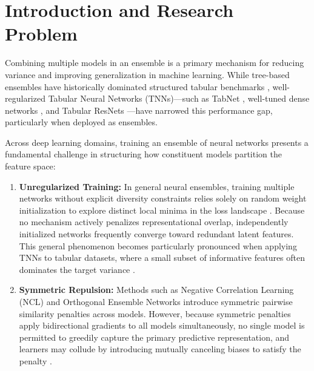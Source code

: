 \documentclass[11pt, a4paper]{article}
\begin{document}
\tableofcontents
\newpage


\section{Introduction and Research Problem}
Combining multiple models in an ensemble is a primary mechanism for reducing variance and improving generalization in machine learning. While tree-based ensembles have historically dominated structured tabular benchmarks \cite{grinsztajn2022why}, well-regularized Tabular Neural Networks (TNNs)—such as TabNet \cite{arik2021tabnet}, well-tuned dense networks \cite{kadra2021well}, and Tabular ResNets \cite{grinsztajn2022why}—have narrowed this performance gap, particularly when deployed as ensembles.

Across deep learning domains, training an ensemble of neural networks presents a fundamental challenge in structuring how constituent models partition the feature space:
\begin{enumerate}
    \item \textbf{Unregularized Training:} In general neural ensembles, training multiple networks without explicit diversity constraints relies solely on random weight initialization to explore distinct local minima in the loss landscape \cite{fort2019deep}. Because no mechanism actively penalizes representational overlap, independently initialized networks frequently converge toward redundant latent features. This general phenomenon becomes particularly pronounced when applying TNNs to tabular datasets, where a small subset of informative features often dominates the target variance \cite{grinsztajn2022why}.
    \item \textbf{Symmetric Repulsion:} Methods such as Negative Correlation Learning (NCL) \cite{liu1999ensemble} and Orthogonal Ensemble Networks \cite{larrazabal2021orthogonal} introduce symmetric pairwise similarity penalties across models. However, because symmetric penalties apply bidirectional gradients to all models simultaneously, no single model is permitted to greedily capture the primary predictive representation, and learners may collude by introducing mutually canceling biases to satisfy the penalty \cite{jeffares2023joint}.
\end{enumerate}
\end{document}
